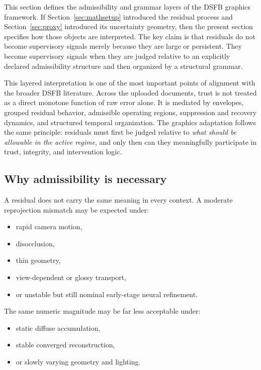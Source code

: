 \documentclass[11pt]{article}
\theoremstyle{definition}
\theoremstyle{plain}
\begin{document}
This section defines the admissibility and grammar layers of the DSFB graphics framework. If Section~\ref{sec:mathsetup} introduced the residual process and Section~\ref{sec:proxy} introduced its uncertainty geometry, then the present section specifies how those objects are interpreted. The key claim is that residuals do not become supervisory signals merely because they are large or persistent. They become supervisory signals when they are judged relative to an explicitly declared admissibility structure and then organized by a structural grammar.

This layered interpretation is one of the most important points of alignment with the broader DSFB literature. Across the uploaded documents, trust is not treated as a direct monotone function of raw error alone. It is mediated by envelopes, grouped residual behavior, admissible operating regions, suppression and recovery dynamics, and structured temporal organization. The graphics adaptation follows the same principle: residuals must first be judged relative to \emph{what should be allowable in the active regime}, and only then can they meaningfully participate in trust, integrity, and intervention logic. 


\subsection{Why admissibility is necessary}

A residual does not carry the same meaning in every context. A moderate reprojection mismatch may be expected under:
\begin{itemize}[leftmargin=1.5em]
    \item rapid camera motion,
    \item disocclusion,
    \item thin geometry,
    \item view-dependent or glossy transport,
    \item or unstable but still nominal early-stage neural refinement.
\end{itemize}

The same numeric magnitude may be far less acceptable under:
\begin{itemize}[leftmargin=1.5em]
    \item static diffuse accumulation,
    \item stable converged reconstruction,
    \item or slowly varying geometry and lighting.
\end{itemize}
\end{document}
